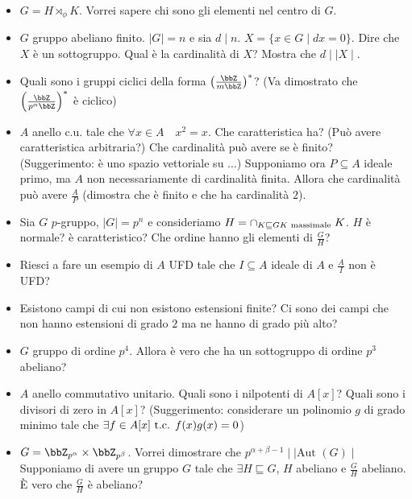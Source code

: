 \documentclass[a4paper,11pt,NoNotes,GeneralMath]{stdmdoc}
\newcommand{\sgr}{\sqsubseteq}
\begin{document}
\begin{itemize}
		\item $G = H \rtimes_\phi K$. Vorrei sapere chi sono gli elementi nel centro di $G$.
		\item $G$ gruppo abeliano finito. $\mid G \mid = n$ e sia $d \mid n$. $X = \{ x \in G \mid dx = 0 \}$. Dire che $X$ è un sottogruppo. Qual è la cardinalità di $X$? Mostra che $d \mid \mid X \mid$.
		\item Quali sono i gruppi ciclici della forma $\left( \frac{\bbZ}{m \bbZ} \right) ^{*}$? (Va dimostrato che $\left( \frac{\bbZ}{p^\alpha \bbZ} \right) ^ {*}$ è ciclico)
		\item $A$ anello c.u. tale che $\forall x \in A \quad x^2 = x$. Che caratteristica ha? (Può avere caratteristica arbitraria?) Che cardinalità può avere se è finito? (Suggerimento: è uno spazio vettoriale su ...) Supponiamo ora $P \subseteq A$ ideale primo, ma $A$ non necessariamente di cardinalità finita. Allora che cardinalità può avere $\frac{A}{P}$ (dimostra che è finito e che ha cardinalità $2$).
		\item Sia $G$ $p$-gruppo, $\mid G \mid = p^n$ e consideriamo $H = \cap_{K \sgr G \\ K \text{ massimale }} K$. $H$ è normale? è caratteristico? Che ordine hanno gli elementi di $\frac{G}{H}$?
		\item Riesci a fare un esempio di $A$ UFD tale che $I \subseteq A$ ideale di $A$ e $\frac{A}{I}$ non è UFD?
		\item Esistono campi di cui non esistono estensioni finite? Ci sono dei campi che non hanno estensioni di grado $2$ ma ne hanno di grado più alto?
		\item $G$ gruppo di ordine $p^4$. Allora è vero che ha un sottogruppo di ordine $p^3$ abeliano?
		\item $A$ anello commutativo unitario. Quali sono i nilpotenti di $A[x]$? Quali sono i divisori di zero in $A[x]$? (Suggerimento: considerare un polinomio $g$ di grado minimo tale che $\exists f \in A[x] \mbox{ t.c. } f(x)g(x) = 0$)
		\item $G = \bbZ_{p^\alpha} \times \bbZ_{p^\beta}$. Vorrei dimostrare che $p^{\alpha + \beta - 1} \mid \mid \text{Aut }(G) \mid$ \\
		Supponiamo di avere un gruppo $G$ tale che $\exists H \sgr G$, $H$ abeliano e $\frac{G}{H}$ abeliano. È vero che $\frac{G}{H}$ è abeliano?
    \end{itemize}
    
\end{document}
